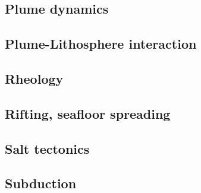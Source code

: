 \cite{zieg92a}
\cite{zhgm98}
\cite{lizh09}
\cite{huss12}
\cite{yoha15}

\subsection*{Plume dynamics}

\cite{nasf94}\cite{hayu94}
\cite{lays99}
\cite{isst06}

\subsection*{Plume-Lithosphere interaction}


\subsection*{Rheology}

\cite{hafn51}
\cite{hand69}
\cite{lova01}
\cite{hirt02}
\cite{hiko03}
\cite{hirw07}
\cite{lemm08}
\cite{lell11}
\cite{lepo13}


\subsection*{Rifting, seafloor spreading}

\cite{hoen86b}
\cite{zieg92b}
\cite{hupc01}
\cite{hube02}\cite{hani02}
\cite{hube03}\cite{hani03}
\cite{hier04}
\cite{hubb05}
\cite{huha07}
\cite{agcz09}
\cite{aubh10}
\cite{alht11}
\cite{alht12}\cite{alhf12}
\cite{hebr14}\cite{lige14}
\cite{nabu15}
\cite{olbm16}\cite{jekm16}

\subsection*{Salt tectonics}

\cite{zaju92}
\cite{nabr93}
\cite{istt04}
\cite{huja07}

\subsection*{Subduction}


